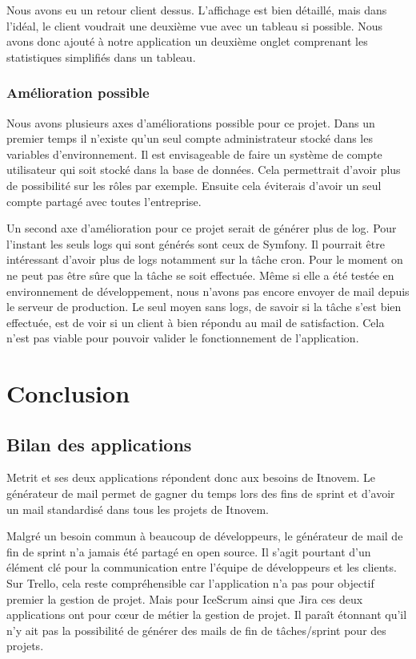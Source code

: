 \documentclass[12pt, twoside, openright]{report}
\begin{document}
Nous avons eu un retour client dessus. L'affichage est bien détaillé, mais dans l'idéal, le client voudrait une deuxième vue avec un tableau si possible. Nous avons donc ajouté à notre application un deuxième onglet comprenant les statistiques simplifiés dans un tableau. 

\subsection{Amélioration possible}

Nous avons plusieurs axes d'améliorations possible pour ce projet. Dans un premier temps il n'existe qu'un seul compte administrateur stocké dans les variables d'environnement. Il est envisageable de faire un système de compte utilisateur qui soit stocké dans la base de données. Cela permettrait d'avoir plus de possibilité sur les rôles par exemple. Ensuite cela éviterais d'avoir un seul compte partagé avec toutes l'entreprise.

Un second axe d'amélioration pour ce projet serait de générer plus de log. Pour l'instant les seuls logs qui sont générés sont ceux de Symfony. Il pourrait être intéressant d'avoir plus de logs notamment sur la tâche cron. Pour le moment on ne peut pas être sûre que la tâche se soit effectuée. Même si elle a été testée en environnement de développement, nous n'avons pas encore envoyer de mail depuis le serveur de production. Le seul moyen sans logs, de savoir si la tâche s'est bien effectuée, est de voir si un client à bien répondu au mail de satisfaction. Cela n'est pas viable pour pouvoir valider le fonctionnement de l'application.

\chapter{Conclusion}

\section{Bilan des applications}

Metrit et ses deux applications répondent donc aux besoins de Itnovem. Le générateur de mail permet de gagner du temps lors des fins de sprint et d'avoir un mail standardisé dans tous les projets de Itnovem. 

Malgré un besoin commun à beaucoup de développeurs, le générateur de mail de fin de sprint n'a jamais été partagé en open source. Il s'agit pourtant d'un élément clé pour la communication entre l'équipe de développeurs et les clients. Sur Trello, cela reste compréhensible car l'application n'a pas pour objectif premier la gestion de projet. Mais pour IceScrum ainsi que Jira ces deux applications ont pour cœur de métier la gestion de projet. Il paraît étonnant qu'il n'y ait pas la possibilité de générer des mails de fin de tâches/sprint pour des projets. 
\end{document}
